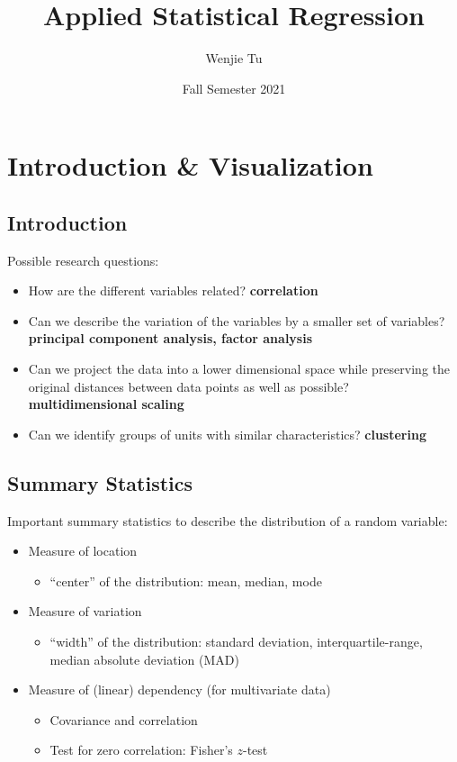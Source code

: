 \documentclass[a4paper]{article}
\title{%
    Applied Statistical Regression
}
\author{Wenjie Tu}
\date{Fall Semester 2021}
\begin{document}

\section{Introduction \& Visualization}

\subsection{Introduction}

Possible research questions:
\begin{itemize}
    \item How are the different variables related? 
    \textbf{correlation}
    \item Can we describe the variation of the variables by a smaller set of variables? 
    \textbf{principal component analysis, factor analysis}
    \item Can we project the data into a lower dimensional space while preserving the original distances between data points as well as possible? 
    \textbf{multidimensional scaling}
    \item Can we identify groups of units with similar characteristics?
    \textbf{clustering}
\end{itemize}

\subsection{Summary Statistics}

Important summary statistics to describe the distribution of a random variable:
\begin{itemize}
    \item Measure of location
    \begin{itemize}
        \item ``center'' of the distribution: mean, median, mode
    \end{itemize}
    \item Measure of variation
    \begin{itemize}
        \item ``width'' of the distribution: standard deviation, interquartile-range, median absolute deviation (MAD)
    \end{itemize}
    \item Measure of (linear) dependency (for multivariate data)
    \begin{itemize}
        \item Covariance and correlation
        \item Test for zero correlation: Fisher's $z$-test
    \end{itemize}
\end{itemize}
\end{document}
